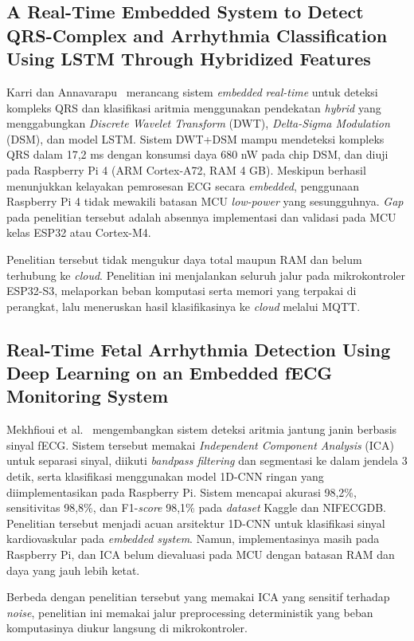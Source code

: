 \subsection{A Real-Time Embedded System to Detect QRS-Complex and Arrhythmia Classification Using LSTM Through Hybridized Features}

Karri dan Annavarapu~\cite{karri_2023} merancang sistem \textit{embedded} \textit{real-time} untuk deteksi kompleks QRS dan klasifikasi aritmia menggunakan pendekatan \textit{hybrid} yang menggabungkan \textit{Discrete Wavelet Transform} (DWT), \textit{Delta-Sigma Modulation} (DSM), dan model LSTM. Sistem DWT+DSM mampu mendeteksi kompleks QRS dalam 17,2 ms dengan konsumsi daya 680 nW pada chip DSM, dan diuji pada Raspberry Pi 4 (ARM Cortex-A72, RAM 4 GB). Meskipun berhasil menunjukkan kelayakan pemrosesan ECG secara \textit{embedded}, penggunaan Raspberry Pi 4 tidak mewakili batasan MCU \textit{low-power} yang sesungguhnya. \textit{Gap} pada penelitian tersebut adalah absennya implementasi dan validasi pada MCU kelas ESP32 atau Cortex-M4.

Penelitian tersebut tidak mengukur daya total maupun RAM dan belum terhubung ke \textit{cloud}. Penelitian ini menjalankan seluruh jalur pada mikrokontroler ESP32-S3, melaporkan beban komputasi serta memori yang terpakai di perangkat, lalu meneruskan hasil klasifikasinya ke \textit{cloud} melalui MQTT.

\subsection{Real-Time Fetal Arrhythmia Detection Using Deep Learning on an Embedded fECG Monitoring System}

Mekhfioui et al.~\cite{mekhfioui_2025} mengembangkan sistem deteksi aritmia jantung janin berbasis sinyal fECG. Sistem tersebut memakai \textit{Independent Component Analysis} (ICA) untuk separasi sinyal, diikuti \textit{bandpass filtering} dan segmentasi ke dalam jendela 3 detik, serta klasifikasi menggunakan model 1D-CNN ringan yang diimplementasikan pada Raspberry Pi. Sistem mencapai akurasi 98,2\%, sensitivitas 98,8\%, dan F1-\textit{score} 98,1\% pada \textit{dataset} Kaggle dan NIFECGDB. Penelitian tersebut menjadi acuan arsitektur 1D-CNN untuk klasifikasi sinyal kardiovaskular pada \textit{embedded system}. Namun, implementasinya masih pada Raspberry Pi, dan ICA belum dievaluasi pada MCU dengan batasan RAM dan daya yang jauh lebih ketat.

Berbeda dengan penelitian tersebut yang memakai ICA yang sensitif terhadap \textit{noise}, penelitian ini memakai jalur preprocessing deterministik yang beban komputasinya diukur langsung di mikrokontroler.

